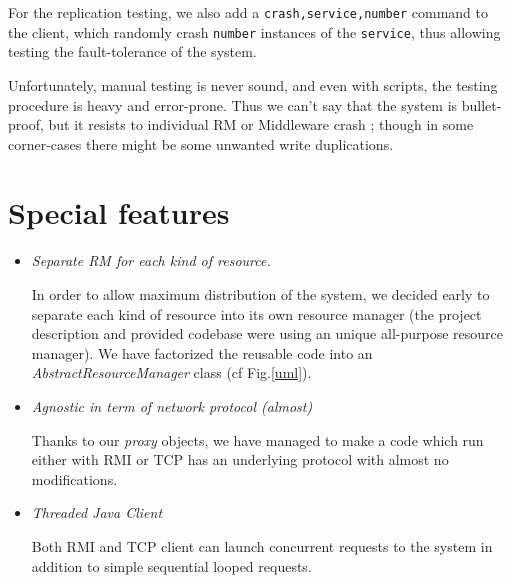\documentclass[a4paper]{article}
\begin{document}
For the replication testing, we also add a \texttt{crash,service,number} command to the client, which randomly crash \texttt{number} instances of the \texttt{service}, thus allowing testing the fault-tolerance of the system.

Unfortunately, manual testing is never sound, and even with scripts, the testing procedure is heavy and error-prone. Thus we can't say that the system is bullet-proof, but it resists to individual RM or Middleware crash ; though in some corner-cases there might be some unwanted write duplications.
\section{Special features}

\begin{itemize}
\item
\emph{Separate RM for each kind of resource.}

In order to allow maximum distribution of the system, we decided early to separate each kind of resource into its own resource manager (the project description and provided codebase were using an unique all-purpose resource manager).
We have factorized the reusable code into an \emph{AbstractResourceManager} class (cf Fig.\ref{uml}).

\item
\emph{Agnostic in term of network protocol (almost)}

Thanks to our \emph{proxy} objects, we have managed to make a code which run either with RMI or TCP has an underlying protocol with almost no modifications.

\item
\emph{Threaded Java Client}

Both RMI and TCP client can launch concurrent requests to the system in addition to simple sequential looped requests.
\end{itemize}
\end{document}
